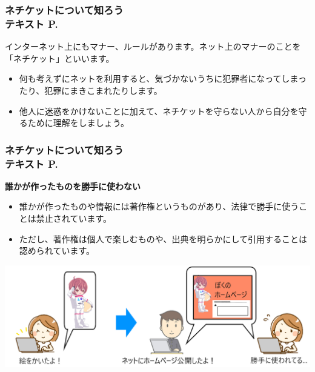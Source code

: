\begin{frame}[fragile]
    \frametitle{ネチケットについて知ろう\\テキスト P.\pageref{1:P:Netiquette}~~~}
    インターネット上にもマナー、ルールがあります。ネット上のマナーのことを「ネチケット」といいます。
            \begin{itemize}\small
                \item 何も考えずにネットを利用すると、気づかないうちに犯罪者になってしまったり、犯罪にまきこまれたりします。
                \item 他人に迷惑をかけないことに加えて、ネチケットを守らない人から自分を守るために理解をしましょう。
            \end{itemize}
            \vfill
\end{frame}

\begin{frame}[fragile]
	\frametitle{ネチケットについて知ろう\\テキスト P.\pageref{1:P:Netiquette}~~~}

    \large\textbf{誰かが作ったものを勝手に使わない}
            \begin{itemize}\small
                \item 誰かが作ったものや情報には著作権というものがあり、法律で勝手に使うことは禁止されています。
                \item ただし、著作権は個人で楽しむものや、出典を明らかにして引用することは認められています。
            \end{itemize}
            \vfill
            
			\begin{minipage}{\textwidth}
                {\upshape
                  \includegraphics[width=\textwidth]{slide07-img/slide07-img001.png}}
            \end{minipage}
\end{frame}

